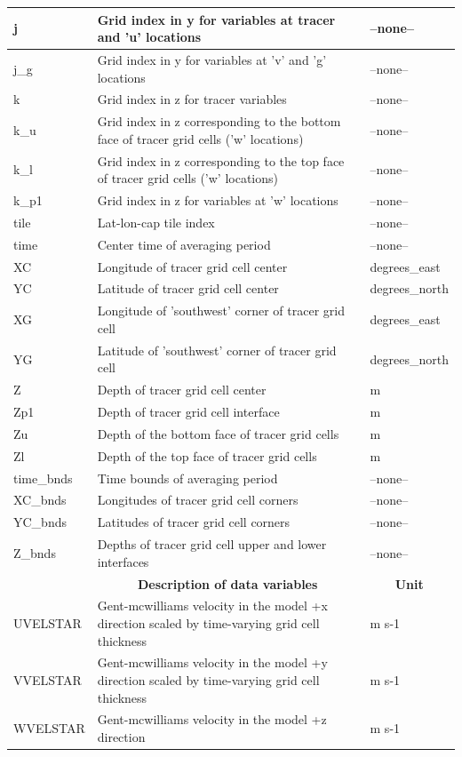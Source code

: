 \begin{longtable}{|m{}|m{}|m{}|}
j &Grid index in y for variables at tracer and 'u' locations &--none--  \\ \hline
j\_g &Grid index in y for variables at 'v' and 'g' locations &--none--  \\ \hline
k &Grid index in z for tracer variables &--none--  \\ \hline
k\_u &Grid index in z corresponding to the bottom face of tracer grid cells ('w' locations) &--none--  \\ \hline
k\_l &Grid index in z corresponding to the top face of tracer grid cells ('w' locations) &--none--  \\ \hline
k\_p1 &Grid index in z for variables at 'w' locations &--none--  \\ \hline
tile &Lat-lon-cap tile index &--none--  \\ \hline
time &Center time of averaging period &--none--  \\ \hline
XC &Longitude of tracer grid cell center &degrees\_east  \\ \hline
YC &Latitude of tracer grid cell center &degrees\_north  \\ \hline
XG &Longitude of 'southwest' corner of tracer grid cell &degrees\_east  \\ \hline
YG &Latitude of 'southwest' corner of tracer grid cell &degrees\_north  \\ \hline
Z &Depth of tracer grid cell center &m  \\ \hline
Zp1 &Depth of tracer grid cell interface &m  \\ \hline
Zu &Depth of the bottom face of tracer grid cells &m  \\ \hline
Zl &Depth of the top face of tracer grid cells &m  \\ \hline
time\_bnds &Time bounds of averaging period &--none--  \\ \hline
XC\_bnds &Longitudes of tracer grid cell corners &--none--  \\ \hline
YC\_bnds &Latitudes of tracer grid cell corners &--none--  \\ \hline
Z\_bnds &Depths of tracer grid cell upper and lower interfaces &--none--  \\ \hline
\rowcolor{lightgray} \multicolumn{1}{|c|}{\textbf{Variables}} & \multicolumn{1}{|c|}{\textbf{Description of data variables}} &  \multicolumn{1}{|c|}{\textbf{Unit}}\\ \hline
UVELSTAR &Gent-mcwilliams velocity in the model +x direction scaled by time-varying grid cell thickness &m s-1  \\ \hline
VVELSTAR &Gent-mcwilliams velocity in the model +y direction scaled by time-varying grid cell thickness &m s-1  \\ \hline
WVELSTAR &Gent-mcwilliams velocity in the model +z direction &m s-1  \\ \hline
\end{longtable}


